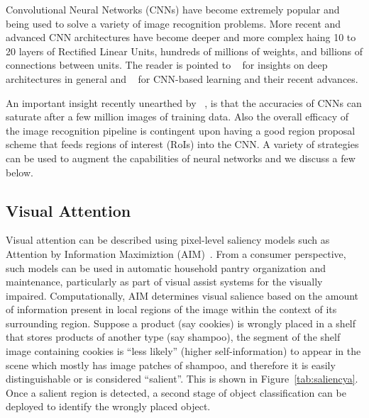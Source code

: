 Convolutional Neural Networks (CNNs) have become extremely popular and being used to solve a variety of image recognition problems. 
More recent and advanced CNN architectures have become deeper and more complex haing 10 to 20 
layers of Rectified Linear Units, hundreds of millions of weights, and billions of connections between units.
The reader is pointed to ~\cite{Bengio2009} for insights on deep architectures in general and ~\cite{DNNNature2015} for CNN-based learning and their recent advances.

An important insight recently unearthed by ~\cite{facenet}, is that the accuracies of CNNs can saturate after a few million images of training data.
Also the overall efficacy of the image recognition pipeline is contingent upon having a good region proposal scheme that feeds regions of interest (RoIs) into the CNN. 
A variety of strategies can be used to augment the capabilities of neural networks and we discuss a few below.

\subsection{Visual Attention}
Visual attention can be described using pixel-level saliency models such as Attention by Information Maximiztion (AIM)~\cite{Bruceb}.
From a consumer perspective, such models can be used in automatic household pantry organization and maintenance, particularly 
as part of visual assist systems for the visually impaired. Computationally, AIM determines visual salience based on the amount of information present in 
local regions of the image within the context of its surrounding region. 
Suppose a product (say cookies) is wrongly placed in a shelf that stores products of another type (say shampoo), the segment of the shelf image containing cookies is 
``less likely'' (higher self-information) to appear in the scene which mostly has image patches of shampoo, 
and therefore it is easily distinguishable or is considered ``salient''. This is shown in Figure~\ref{tab:saliencya}.
Once a salient region is detected, a second stage of object classification can be deployed to identify the wrongly placed object.  

